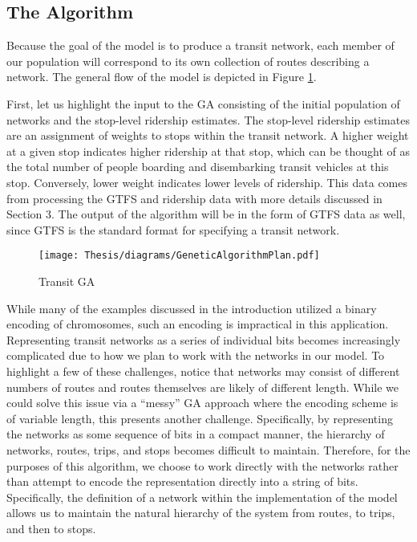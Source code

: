 \documentclass[11pt]{amsart}
\theoremstyle{definition}                  %
\theoremstyle{remark}                       %
\numberwithin{equation}{section}
\begin{document}
\subsection{The Algorithm}
Because the goal of the model is to produce a transit network, each member of our population will correspond to its own collection of routes describing a network. The general flow of the model is depicted in Figure \ref{diagram:my_ga}. 

First, let us highlight the input to the GA consisting of the initial population of networks and the stop-level ridership estimates. The stop-level ridership estimates are an assignment of weights to stops within the transit network. A higher weight at a given stop indicates higher ridership at that stop, which can be thought of as the total number of people boarding and disembarking transit vehicles at this stop. Conversely, lower weight indicates lower levels of ridership. This data comes from processing the GTFS and ridership data with more details discussed in Section 3. The output of the algorithm will be in the form of GTFS data as well, since GTFS is the standard format for specifying a transit network. 

\begin{figure}[h]
    \centering
    \texttt{[image: Thesis/diagrams/GeneticAlgorithmPlan.pdf]}
    \caption{Transit GA}
    \label{diagram:my_ga}
\end{figure}

While many of the examples discussed in the introduction utilized a binary encoding of chromosomes, such an encoding is impractical in this application. Representing transit networks as a series of individual bits becomes increasingly complicated due to how we plan to work with the networks in our model. To highlight a few of these challenges, notice that networks may consist of different numbers of routes and routes themselves are likely of different length. While we could solve this issue via a ``messy'' GA approach where the encoding scheme is of variable length, this presents another challenge. Specifically, by representing the networks as some sequence of bits in a compact manner, the hierarchy of networks, routes, trips, and stops becomes difficult to maintain. Therefore, for the purposes of this algorithm, we choose to work directly with the networks rather than attempt to encode the representation directly into a string of bits. Specifically, the definition of a network within the implementation of the model allows us to maintain the natural hierarchy of the system from routes, to trips, and then to stops. 
\end{document}
